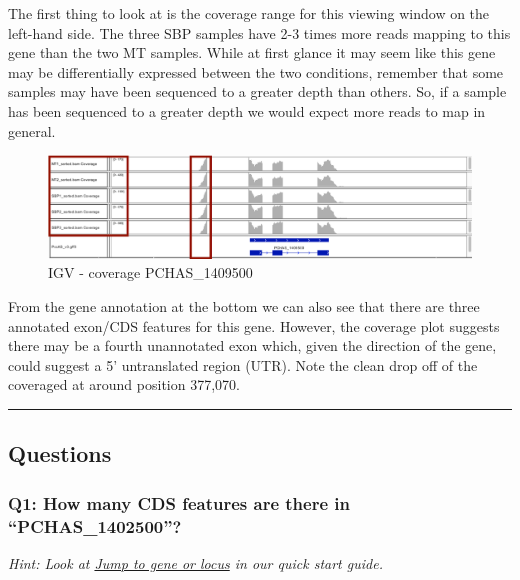 \documentclass[11pt]{article}
\begin{document}
    The first thing to look at is the coverage range for this viewing window
on the left-hand side. The three SBP samples have 2-3 times more reads
mapping to this gene than the two MT samples. While at first glance it
may seem like this gene may be differentially expressed between the two
conditions, remember that some samples may have been sequenced to a
greater depth than others. So, if a sample has been sequenced to a
greater depth we would expect more reads to map in general.

    \begin{figure}[!h]
\centering
\includegraphics{images/igv-coverage-pchas1409500.png}
\caption{IGV - coverage PCHAS\_1409500}
\end{figure}

\newpage

    From the gene annotation at the bottom we can also see that there are
three annotated exon/CDS features for this gene. However, the coverage
plot suggests there may be a fourth unannotated exon which, given the
direction of the gene, could suggest a 5' untranslated region (UTR).
Note the clean drop off of the coveraged at around position 377,070.

    \begin{center}\rule{0.5\linewidth}{0.5pt}\end{center}

    \hypertarget{questions}{%
\subsection{Questions}\label{questions}}

\hypertarget{q1-how-many-cds-features-are-there-in-pchas_1402500}{%
\subsubsection{Q1: How many CDS features are there in
``PCHAS\_1402500''?}\label{q1-how-many-cds-features-are-there-in-pchas_1402500}}

\textit{Hint: Look at
\href{https://github.com/sanger-pathogens/pathogen-informatics-training/blob/master/Notebooks/IGV/index.ipynb}{Jump
to gene or locus} in our quick start guide.}
\end{document}
